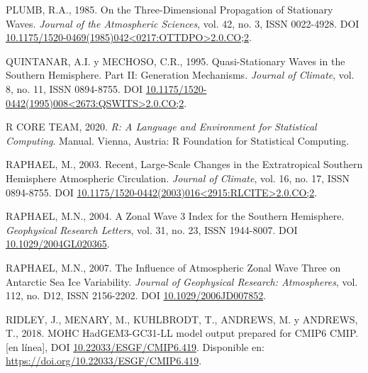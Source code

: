 \documentclass[12pt,oneside,a4paper]{reedthesis}
\newlength{\cslhangindent}
\newenvironment{CSLReferences}[2] %
 {%
  \setlength{\parindent}{0pt}
  \ifodd #1 \everypar{\setlength{\hangindent}{\cslhangindent}}\ignorespaces\fi
  \ifnum #2 > 0
  \setlength{\parskip}{#2\baselineskip}
  \fi
 }%
 {}
\begin{document}
\begin{CSLReferences}{1}{0}
\leavevmode{}%
PLUMB, R.A., 1985. On the {Three-Dimensional Propagation} of {Stationary Waves}. \emph{Journal of the Atmospheric Sciences}, vol. 42, no. 3, ISSN 0022-4928. DOI \href{https://doi.org/10.1175/1520-0469(1985)042\%3C0217:OTTDPO\%3E2.0.CO;2}{10.1175/1520-0469(1985)042\textless0217:OTTDPO\textgreater2.0.CO;2}.

\leavevmode{}%
QUINTANAR, A.I. y MECHOSO, C.R., 1995. Quasi-{Stationary Waves} in the {Southern Hemisphere}. {Part II}: {Generation Mechanisms}. \emph{Journal of Climate}, vol. 8, no. 11, ISSN 0894-8755. DOI \href{https://doi.org/10.1175/1520-0442(1995)008\%3C2673:QSWITS\%3E2.0.CO;2}{10.1175/1520-0442(1995)008\textless2673:QSWITS\textgreater2.0.CO;2}.

\leavevmode{}%
R CORE TEAM, 2020. \emph{R: {A} Language and Environment for Statistical Computing}. Manual. Vienna, Austria: R Foundation for Statistical Computing.

\leavevmode{}%
RAPHAEL, M., 2003. Recent, {Large-Scale Changes} in the {Extratropical Southern Hemisphere Atmospheric Circulation}. \emph{Journal of Climate}, vol. 16, no. 17, ISSN 0894-8755. DOI \href{https://doi.org/10.1175/1520-0442(2003)016\%3C2915:RLCITE\%3E2.0.CO;2}{10.1175/1520-0442(2003)016\textless2915:RLCITE\textgreater2.0.CO;2}.

\leavevmode{}%
RAPHAEL, M.N., 2004. A Zonal Wave 3 Index for the {Southern Hemisphere}. \emph{Geophysical Research Letters}, vol. 31, no. 23, ISSN 1944-8007. DOI \href{https://doi.org/10.1029/2004GL020365}{10.1029/2004GL020365}.

\leavevmode{}%
RAPHAEL, M.N., 2007. The Influence of Atmospheric Zonal Wave Three on {Antarctic} Sea Ice Variability. \emph{Journal of Geophysical Research: Atmospheres}, vol. 112, no. D12, ISSN 2156-2202. DOI \href{https://doi.org/10.1029/2006JD007852}{10.1029/2006JD007852}.

\leavevmode{}%
RIDLEY, J., MENARY, M., KUHLBRODT, T., ANDREWS, M. y ANDREWS, T., 2018. MOHC HadGEM3-GC31-LL model output prepared for CMIP6 CMIP. {[}en línea{]}, DOI \href{https://doi.org/10.22033/ESGF/CMIP6.419}{10.22033/ESGF/CMIP6.419}. Disponible en: \url{https://doi.org/10.22033/ESGF/CMIP6.419}.


\end{CSLReferences}
\end{document}
